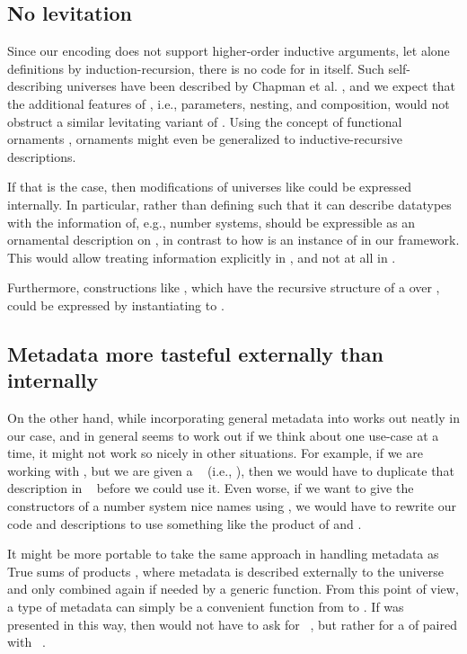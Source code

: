 \subsection{No levitation}
Since our encoding does not support higher-order inductive arguments, let alone definitions by induction-recursion, there is no code for  in itself. Such self-describing universes have been described by Chapman et al. \cite{levitation}, and we expect that the additional features of , i.e., parameters, nesting, and composition, would not obstruct a similar levitating variant of . Using the concept of functional ornaments \cite{orntrans}, ornaments might even be generalized to inductive-recursive descriptions.

If that is the case, then modifications of universes like  could be expressed internally. In particular, rather than defining  such that it can describe datatypes with the information of, e.g., number systems,  should be expressible as an ornamental description on , in contrast to how  is an instance of  in our framework. This would allow treating information explicitly in , and not at all in .

Furthermore, constructions like , which have the recursive structure of a  over , could be expressed by instantiating  to .


\subsection{Metadata more tasteful externally than internally}
On the other hand, while incorporating general metadata into  works out neatly in our case, and in general seems to work out if we think about one use-case at a time, it might not work so nicely in other situations. For example, if we are working with , but we are given a \  (i.e., ), then we would have to duplicate that description in \  before we could use it. Even worse, if we want to give the constructors of a number system nice names using , we would have to rewrite our code and descriptions to use something like the product of  and . 

It might be more portable to take the same approach in handling metadata as True sums of products \cite{truesop}, where metadata is described externally to the universe and only combined again if needed by a generic function. From this point of view, a type of metadata can simply be a convenient function from  to . If  was presented in this way, then  would not have to ask for \ , but rather for a  of  paired with \ .


